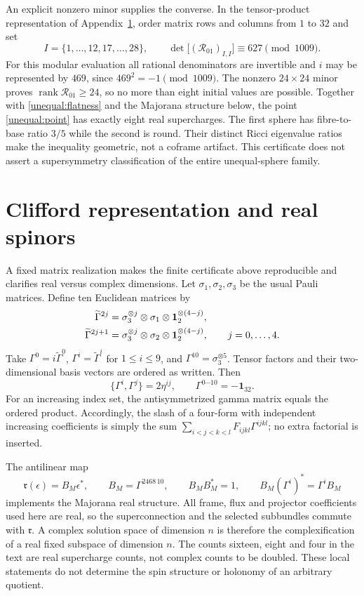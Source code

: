 An explicit nonzero minor supplies the converse. In the tensor-product representation of Appendix~\ref{app:clifford}, order matrix rows and columns from $1$ to $32$ and set
\begin{equation}
I=\{1,\ldots,12,17,\ldots,28\},\qquad
\det\big[(\mathcal R_{01})_{I,I}\big]\equiv627\pmod{1009}.
\label{unequal:minor}
\end{equation}
For this modular evaluation all rational denominators are invertible and $i$ may be represented by $469$, since $469^2=-1\pmod{1009}$. The nonzero $24\times24$ minor proves $\operatorname{rank}\mathcal R_{01}\geq24$, so no more than eight initial values are possible. Together with \eqref{unequal:flatness} and the Majorana structure below, the point \eqref{unequal:point} has exactly eight real supercharges. The first sphere has fibre-to-base ratio $3/5$ while the second is round. Their distinct Ricci eigenvalue ratios make the inequality geometric, not a coframe artifact. This certificate does not assert a supersymmetry classification of the entire unequal-sphere family.

\section{Clifford representation and real spinors}\label{app:clifford}
A fixed matrix realization makes the finite certificate above reproducible and clarifies real versus complex dimensions. Let $\sigma_1,\sigma_2,\sigma_3$ be the usual Pauli matrices. Define ten Euclidean matrices by
\begin{align}
\widetilde\Gamma^{2j}&=\sigma_3^{\otimes j}\otimes\sigma_1
\otimes\mathbf1_2^{\otimes(4-j)},\notag\\
\widetilde\Gamma^{2j+1}&=\sigma_3^{\otimes j}\otimes\sigma_2
\otimes\mathbf1_2^{\otimes(4-j)},\qquad j=0,\ldots,4.
\end{align}
Take $\Gamma^0=i\widetilde\Gamma^0$, $\Gamma^i=\widetilde\Gamma^i$ for $1\leq i\leq9$, and $\Gamma^{10}=\sigma_3^{\otimes5}$. Tensor factors and their two-dimensional basis vectors are ordered as written. Then
\begin{equation}
\{\Gamma^i,\Gamma^j\}=2\eta^{ij},\qquad
\Gamma^{0\cdots10}=-\mathbf1_{32}.
\end{equation}
For an increasing index set, the antisymmetrized gamma matrix equals the ordered product. Accordingly, the slash of a four-form with independent increasing coefficients is simply the sum $\sum_{i<j<k<l}F_{ijkl}\Gamma^{ijkl}$; no extra factorial is inserted.

The antilinear map
\begin{equation}
\mathfrak r(\epsilon)=B_M\epsilon^*,\qquad
B_M=\Gamma^{2468\,10},\qquad
B_MB_M^*=1,\qquad B_M(\Gamma^i)^*=\Gamma^iB_M
\end{equation}
implements the Majorana real structure. All frame, flux and projector coefficients used here are real, so the superconnection and the selected subbundles commute with $\mathfrak r$. A complex solution space of dimension $n$ is therefore the complexification of a real fixed subspace of dimension $n$. The counts sixteen, eight and four in the text are real supercharge counts, not complex counts to be doubled. These local statements do not determine the spin structure or holonomy of an arbitrary quotient.
